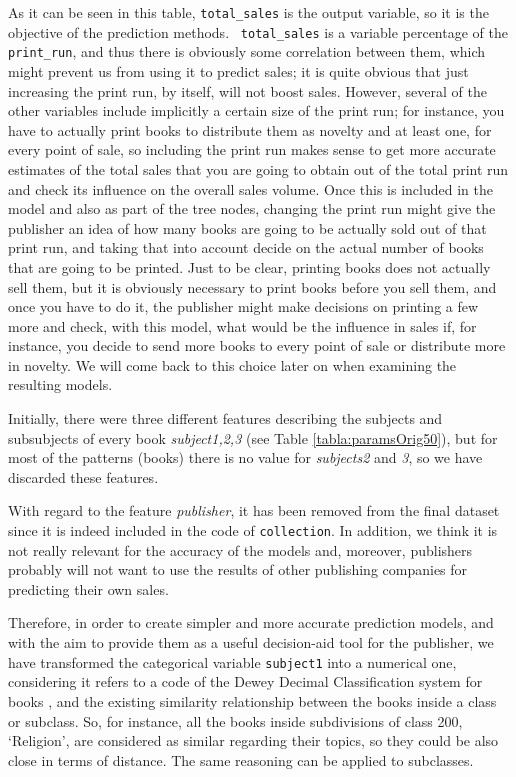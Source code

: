 \documentclass[a4paper,10pt,twocolumn,preprint,3p]{elsarticle}
\begin{document}
As it can be seen in this table, \texttt{total\_sales} is the output
variable, so it is the objective of the prediction methods. {\tt
  total\_sales} is a variable percentage of the {\tt print\_run}, and
thus there is obviously some correlation between them, which might
prevent us from using it to predict sales; it is quite obvious that
just increasing the print run, by itself, will not boost
sales. However, several of the other variables include implicitly a
certain size of the print run; for instance, you have to actually
print books to distribute them as novelty and at least one, for every
point of sale, so including the print run makes sense to get more
accurate estimates of the total sales that you are going to obtain out
of the total print run and check its influence on the overall sales
volume. Once this is included in the model and also as part of the
tree nodes, changing the print run might give the publisher an idea of
how many books are going to be actually sold out of that print run,
and taking that into account decide on the actual number of books that
are going to be printed. Just to be clear, printing books does not
actually sell them, but it is obviously necessary to print books
before you sell them, and once you have to do it, the publisher might
make decisions on printing a few more and check, with this model, what
would be the influence in sales if, for instance, you decide to send
more books to every point of sale or distribute more in novelty. We
will come back to this choice later on when examining the resulting
models. 

Initially, there were three different features describing the subjects
and subsubjects of every book \textit{subject1,2,3} (see Table
\ref{tabla:paramsOrig50}), but for most of the patterns (books) there
is no value for \textit{subjects2} and \textit{3}, so we have discarded 
these features.   

With regard to the feature \textit{publisher}, it has been removed from the final dataset since it is indeed included in the code of \texttt{collection}. In addition, we think it is not really relevant for the accuracy of the models and, moreover, publishers probably will not want to use the results of other publishing companies for predicting their own sales.

Therefore, in order to create simpler and more accurate prediction
models, and with the aim to provide them as a useful decision-aid tool
for the publisher, we have transformed the categorical variable
\texttt{subject1} into a numerical one, considering it refers to a
code of the Dewey Decimal Classification system for books
\cite{wiki:dewey}, and the existing similarity relationship between
the books inside a class or subclass. So, for instance, all the books
inside subdivisions of class 200, `Religion', are considered as
similar regarding their topics, so they could be also close in terms
of distance. The same reasoning can be applied to subclasses. 
\end{document}
